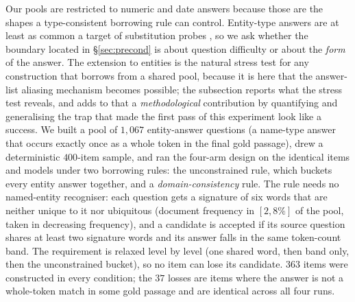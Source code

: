 \documentclass[11pt]{article}
\begin{document}
Our pools are restricted to numeric and date answers because those are the shapes a
type-consistent borrowing rule can control. Entity-type answers are at least as common a
target of substitution probes \citep{longpre2021entity}, so we ask whether the boundary
located in \S\ref{sec:precond} is about question difficulty or about the \emph{form} of the
answer. The extension to entities is the natural stress test for any construction that
borrows from a shared pool, because it is here that the answer-list aliasing mechanism
becomes possible; the subsection reports what the stress test reveals, and adds to that a
\emph{methodological} contribution by quantifying and generalising the trap that made the
first pass of this experiment look like a success. We built a pool of $1{,}067$ entity-answer questions (a name-type answer that occurs
exactly once as a whole token in the final gold passage), drew a deterministic $400$-item
sample, and ran the four-arm design on the identical items and models under two borrowing
rules: the unconstrained rule, which buckets every entity answer together, and a
\emph{domain-consistency} rule. The rule needs no named-entity recogniser: each question gets
a signature of six words that are neither unique to it nor ubiquitous (document frequency in
$[2,8\%]$ of the pool, taken in decreasing frequency), and a candidate is accepted if its
source question shares at least two signature words and its answer falls in the same
token-count band. The requirement is relaxed level by level (one shared word, then band only,
then the unconstrained bucket), so no item can lose its candidate.
$363$ items were constructed in every condition; the $37$ losses are items where the answer
is not a whole-token match in some gold passage and are identical across all four runs.
\end{document}
